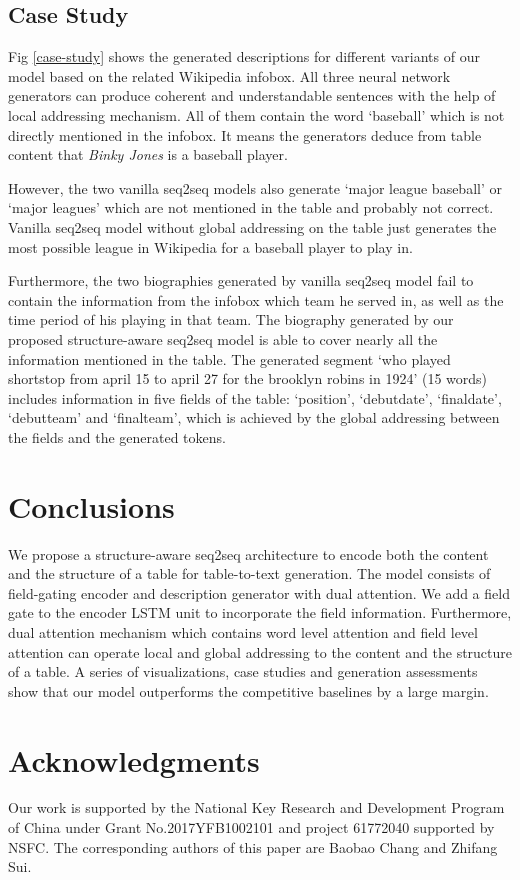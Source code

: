\documentclass[letterpaper]{article} %
\begin{document}
\subsection{Case Study}
Fig \ref{case-study} shows the generated descriptions for different variants of our model based on the related Wikipedia infobox. 
All three neural network generators can produce coherent and understandable sentences with the help of local addressing mechanism. All of them contain the word `baseball' which is not directly mentioned in the infobox. 
It means the generators deduce from table content that \textit{Binky Jones} is a baseball player.

However, the two vanilla seq2seq models also generate `major league baseball' or `major leagues' which are not mentioned in the table and probably not correct. Vanilla seq2seq model without global addressing on the table just generates the most possible league in Wikipedia for a baseball player to play in. 

Furthermore, the two biographies generated by vanilla seq2seq model fail to contain the information from the infobox which team he served in, as well as the time period of his playing in that team.
The biography generated by our proposed structure-aware seq2seq model is able to cover nearly all the information mentioned in the table. The generated segment `who played shortstop from april 15 to april 27 for the brooklyn robins in 1924' (15 words) includes information in five fields of the table: `position', `debutdate', `finaldate', `debutteam' and `finalteam', which is achieved by the global addressing between the fields and the generated tokens.



\section{Conclusions}
We propose a structure-aware seq2seq architecture to encode both the content and the structure of a table for table-to-text generation.
The model consists of field-gating encoder and description generator with dual attention. We add a field gate to the encoder LSTM unit to incorporate the field information. 
Furthermore, dual attention mechanism which contains word level attention and field level attention can operate local and global addressing to the content and the structure of a table.
A series of visualizations, case studies and generation assessments show that our model outperforms the competitive baselines by a large margin.

\section{Acknowledgments}

Our work is supported by the National Key Research and Development Program of China under Grant No.2017YFB1002101 and project 61772040 supported by NSFC. The corresponding authors of this paper are Baobao Chang and Zhifang Sui.



\end{document}
